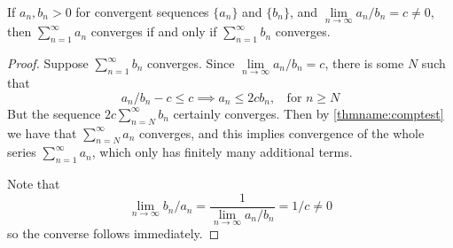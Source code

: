 \documentclass[12pt, a4paper, oneside, openright, titlepage]{book}
\begin{document}
\begin{namthm}\label{thmname:limcomptest}
    If $a_n, b_n > 0$ for convergent sequences $\{a_n\}$ and $\{b_n\}$, and $\lim\limits_{n\rightarrow \infty}a_n/b_n = c \neq 0$, then $\sum\limits_{n=1}^{\infty}a_n$ converges if and only if $\sum\limits_{n=1}^{\infty}b_n$ converges.
\end{namthm}
\begin{proof}
    Suppose $\sum\limits_{n=1}^{\infty}b_n$ converges. Since $\lim\limits_{n\rightarrow \infty}a_n/b_n = c$, there is some $N$ such that \begin{equation*}
        a_n/b_n - c \leq c \implies a_n \leq 2cb_n,\;\;\text{ for } n\geq N
    \end{equation*}
    But the sequence $2c\sum\limits_{n=N}^{\infty}b_n$ certainly converges. Then by \ref{thmname:comptest} we have that $\sum\limits_{n=N}^{\infty}a_n$ converges, and this implies convergence of the whole series $\sum\limits_{n=1}^{\infty}a_n$, which only has finitely many additional terms.
    
    Note that \begin{equation*}
        \lim\limits_{n\rightarrow \infty}b_n/a_n = \frac{1}{\lim\limits_{n\rightarrow\infty}a_n/b_n} = 1/c \neq 0
    \end{equation*}
    so the converse follows immediately.
\end{proof}
\end{document}
